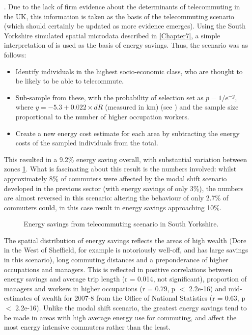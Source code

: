 \citep[p.~336]{Helminen2007}. Due to the lack of firm evidence about the
determinants of telecommuting in the UK, this information is taken as the
basis of the telecommuting scenario (which should certainly be updated
as more evidence emerges). Using the South Yorkshire simulated spatial microdata
described in \cref{Chapter7}, a simple interpretation of
\citet{Helminen2007} is used as the basis of energy savings. Thus, the scenario
was as follows:
\begin{itemize}
 \item Identify individuals in the highest socio-economic class, who are thought
 to be likely to be able to telecommute.
 \item Sub-sample from these, with the probability of selection set as
 $p = 1/e^{-y}$, where $y = −5.3 + 0.022 \times dR$ (measured in km) (see
 \citealp{Helminen2007}) and the sample size proportional to the number of
 higher occupation workers.
 \item Create a new energy cost estimate for each area by subtracting the
 energy costs of the sampled individuals from the total.
\end{itemize}
This resulted in a 9.2\% energy saving overall, with substantial variation between
zones \cref{ftelesave}. What is fascinating about this result is the numbers
involved: whilst approximately 8\% of commuters were affected by the
modal shift scenario developed in the previous sector (with energy savings
of only 3\%), the numbers are almost reversed in this scenario: altering the
behaviour of only 2.7\% of commuters could, in this case result in energy
savings approaching 10\%.

\begin{figure}
 \caption{Energy savings from telecommuting scenario in South Yorkshire.}
 \label{ftelesave}
\end{figure}

The spatial distribution of energy savings reflects the areas of high wealth
(Dore in the West of Sheffield, for example is notoriously well-off, and has large savings
in this scenario), long commuting distances and a preponderance of higher occupations
and managers. This is reflected in positive correlations between energy savings
and average trip length (r = 0.014, not significant), proportion of managers
and workers in higher occupations (r = 0.79, p $<$ 2.2e-16) and
mid-estimates of wealth for 2007-8 from the Office of National Statistics
(r = 0.63, p $<$ 2.2e-16). Unlike the modal shift scenario, the
greatest energy savings tend to be made in areas with high average energy
use for commuting, and affect the most energy intensive commuters rather than
the least.

